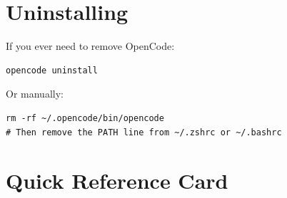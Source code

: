\documentclass[11pt]{article}
\begin{document}
\section{Uninstalling}

If you ever need to remove OpenCode:

\begin{lstlisting}[style=term]
opencode uninstall
\end{lstlisting}

Or manually:

\begin{lstlisting}[style=term]
rm -rf ~/.opencode/bin/opencode
# Then remove the PATH line from ~/.zshrc or ~/.bashrc
\end{lstlisting}

\section{Quick Reference Card}
\end{document}
